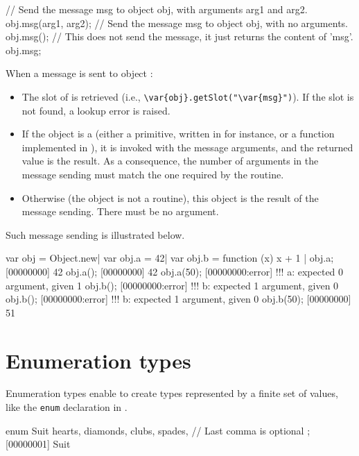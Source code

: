 \begin{urbiunchecked}
// Send the message msg to object obj, with arguments arg1 and arg2.
obj.msg(arg1, arg2);
// Send the message msg to object obj, with no arguments.
obj.msg();
// This does not send the message, it just returns the content of 'msg'.
obj.msg;
\end{urbiunchecked}

When a message  is sent to object :

\begin{itemize}
\item The  slot of  is retrieved (i.e.,
  \lstinline[style=varInString]|\var{obj}.getSlot("\var{msg}")|). If the
  slot is not found, a lookup error is raised.
\item If the object is a  (either a primitive, written in \Cxx
  for instance, or a function implemented in \us), it is invoked with the
  message arguments, and the returned value is the result. As a consequence,
  the number of arguments in the message sending must match the one required
  by the routine.
\item Otherwise (the object is not a routine), this object is the result of
  the message sending. There must be no argument.
\end{itemize}

Such message sending is illustrated below.

\begin{urbiscript}
var obj = Object.new|
var obj.a = 42|
var obj.b = function (x) { x + 1 }|
obj.a;
[00000000] 42
obj.a();
[00000000] 42
obj.a(50);
[00000000:error] !!! a: expected 0 argument, given 1
obj.b();
[00000000:error] !!! b: expected 1 argument, given 0
obj.b();
[00000000:error] !!! b: expected 1 argument, given 0
obj.b(50);
[00000000] 51
\end{urbiscript}

\section{Enumeration types}
\label{sec:lang:enum}

Enumeration types enable to create types represented by a finite set of
values, like the \lstinline{enum} declaration in \langC.

\begin{urbiscript}
enum Suit
{
  hearts,
  diamonds,
  clubs,
  spades, // Last comma is optional
};
[00000001] Suit
\end{urbiscript}

